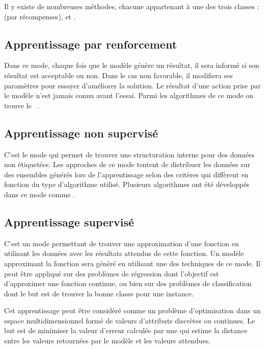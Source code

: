 Il y existe de nombreuses méthodes, chacune appartenant à
une des trois classes :
 (par récompenses),
 et
.

\subsection{Apprentissage par renforcement}

Dans ce mode, chaque fois que le modèle génère un résultat, il sera informé
si son résultat est acceptable ou non. Dans le cas non favorable, il modifiera
ses paramètres pour essayer d'améliorer la solution. Le résultat d'une action
prise par le modèle n'est jamais connu avant l'essai. Parmi les algorithmes de ce
mode on trouve le ~\cite{Watkins1992}.

\subsection{Apprentissage non supervisé}

C'est le mode qui permet de trouver une structuration interne pour des données
non étiquetées. Les approches de ce mode tentent de distribuer les données sur
des ensembles générés lors de l'apprentissage selon des critères qui diffèrent
en fonction du type d'algorithme utilisé. Plusieurs algorithmes ont été
développés dans ce mode comme .

\subsection{Apprentissage supervisé}

C'est un mode permettant de trouver une approximation d'une fonction en utilisant
les données avec les résultats attendus de cette fonction. Un modèle approximant
la fonction sera généré en utilisant une des techniques de ce mode.
Il peut être appliqué sur des problèmes de régression dont l'objectif est
d'approximer une fonction continue, ou bien sur des problèmes de classification
dont le but est de trouver la bonne classe pour une instance.

Cet apprentissage peut être considéré comme un problème d'optimisation
dans un espace multidimensionnel formé de valeurs d'attributs discrètes ou
continues. Le but est de minimiser la valeur d'erreur calculée par une
 qui estime la distance entre les valeurs retournées
par le modèle et les valeurs attendues.

